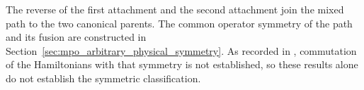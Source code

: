 The reverse of the first attachment and the second attachment join the
mixed path to the two canonical parents. The common operator symmetry of the
path and its fusion are constructed in
Section~\ref{sec:mpo_arbitrary_physical_symmetry}. As recorded in
\cite{gap:glm23_mpo_symmetric_mps_scope}, commutation of the Hamiltonians
with that symmetry is not established, so these results alone do not
establish the symmetric classification.
